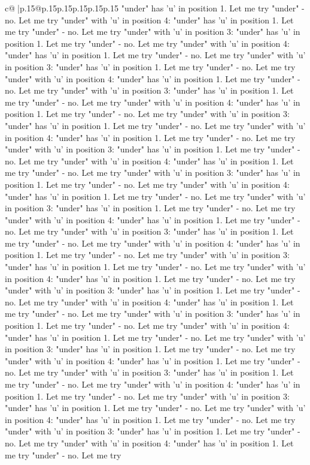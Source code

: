 \documentclass{article}
\begin{document}
{\begin{supertabular}{c@{$\;$}|p{.15\linewidth}@{}p{.15\linewidth}p{.15\linewidth}p{.15\linewidth}p{.15\linewidth}p{.15\linewidth}}
{{{"under" has 'u' in position 1. Let me try "under" {-} no. Let me try "under" with 'u' in position 4: "under" has 'u' in position 1. Let me try "under" {-} no. Let me try "under" with 'u' in position 3: "under" has 'u' in position 1. Let me try "under" {-} no. Let me try "under" with 'u' in position 4: "under" has 'u' in position 1. Let me try "under" {-} no. Let me try "under" with 'u' in position 3: "under" has 'u' in position 1. Let me try "under" {-} no. Let me try "under" with 'u' in position 4: "under" has 'u' in position 1. Let me try "under" {-} no. Let me try "under" with 'u' in position 3: "under" has 'u' in position 1. Let me try "under" {-} no. Let me try "under" with 'u' in position 4: "under" has 'u' in position 1. Let me try "under" {-} no. Let me try "under" with 'u' in position 3: "under" has 'u' in position 1. Let me try "under" {-} no. Let me try "under" with 'u' in position 4: "under" has 'u' in position 1. Let me try "under" {-} no. Let me try "under" with 'u' in position 3: "under" has 'u' in position 1. Let me try "under" {-} no. Let me try "under" with 'u' in position 4: "under" has 'u' in position 1. Let me try "under" {-} no. Let me try "under" with 'u' in position 3: "under" has 'u' in position 1. Let me try "under" {-} no. Let me try "under" with 'u' in position 4: "under" has 'u' in position 1. Let me try "under" {-} no. Let me try "under" with 'u' in position 3: "under" has 'u' in position 1. Let me try "under" {-} no. Let me try "under" with 'u' in position 4: "under" has 'u' in position 1. Let me try "under" {-} no. Let me try "under" with 'u' in position 3: "under" has 'u' in position 1. Let me try "under" {-} no. Let me try "under" with 'u' in position 4: "under" has 'u' in position 1. Let me try "under" {-} no. Let me try "under" with 'u' in position 3: "under" has 'u' in position 1. Let me try "under" {-} no. Let me try "under" with 'u' in position 4: "under" has 'u' in position 1. Let me try "under" {-} no. Let me try "under" with 'u' in position 3: "under" has 'u' in position 1. Let me try "under" {-} no. Let me try "under" with 'u' in position 4: "under" has 'u' in position 1. Let me try "under" {-} no. Let me try "under" with 'u' in position 3: "under" has 'u' in position 1. Let me try "under" {-} no. Let me try "under" with 'u' in position 4: "under" has 'u' in position 1. Let me try "under" {-} no. Let me try "under" with 'u' in position 3: "under" has 'u' in position 1. Let me try "under" {-} no. Let me try "under" with 'u' in position 4: "under" has 'u' in position 1. Let me try "under" {-} no. Let me try "under" with 'u' in position 3: "under" has 'u' in position 1. Let me try "under" {-} no. Let me try "under" with 'u' in position 4: "under" has 'u' in position 1. Let me try "under" {-} no. Let me try "under" with 'u' in position 3: "under" has 'u' in position 1. Let me try "under" {-} no. Let me try "under" with 'u' in position 4: "under" has 'u' in position 1. Let me try "under" {-} no. Let me try "under" with 'u' in position 3: "under" has 'u' in position 1. Let me try "under" {-} no. Let me try "under" with 'u' in position 4: "under" has 'u' in position 1. Let me try "under" {-} no. Let me try }}}
\end{supertabular}}
\end{document}
